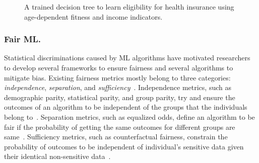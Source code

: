 \begin{figure}[t!]
\begin{minipage}{.2\columnwidth}
	\end{minipage}\hfill
	\begin{minipage}{.5\columnwidth}
	\end{minipage}%
	\caption{A trained decision tree to learn eligibility for health insurance using age-dependent fitness and income indicators.}\label{fairness_justicia_fig:fair_example}

\end{figure}
\subsubsection{Fair ML.} Statistical discriminations caused by ML algorithms have motivated researchers to develop several frameworks to ensure fairness and several algorithms to mitigate bias.
Existing fairness metrics mostly belong to three categories: \textit{independence}, \textit{separation}, and \textit{sufficiency}~\cite{mehrabi2019survey}. 
Independence metrics, such as demographic parity, statistical parity, and group parity, try and ensure the outcomes of an algorithm to be independent of the groups that the individuals belong to~\cite{feldman2015certifying,dwork2012fairness}.
Separation metrics, such as equalized odds, define an algorithm to be fair if the probability of getting the same outcomes for different groups are same~\cite{hardt2016equality}.
Sufficiency metrics, such as counterfactual fairness, constrain the probability of outcomes to be independent of individual's sensitive data given their identical non-sensitive data~\cite{kusner2017counterfactual}. %

